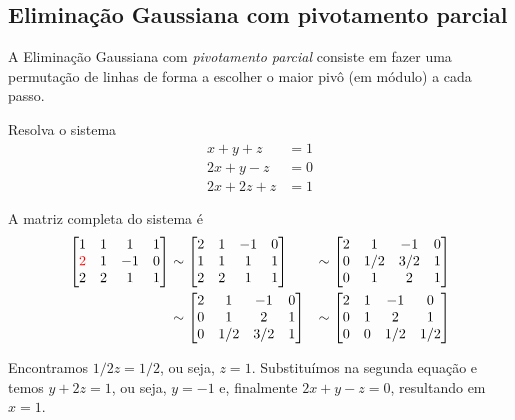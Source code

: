 \subsection{Eliminação Gaussiana com pivotamento parcial}
A Eliminação Gaussiana com \emph{pivotamento parcial} consiste em fazer uma permutação de linhas de forma a escolher o maior pivô (em módulo) a cada passo.

\begin{ex} Resolva o sistema
\begin{align}
  x+y+z &=1\\
  2x+y-z&=0\\
  2x+2z+z&=1
\end{align}

\end{ex}

\begin{sol}
A matriz completa do sistema é
\begin{align}
  \begin{bmatrix}
  1 &1&  1&1\\
  {\color{red}{2}} &1& -1&0\\
  2 & 2 &1&1
  \end{bmatrix}
&\sim
  \begin{bmatrix}
  2 &1& -1&0\\
  1 &1&  1&1\\
  2 &2&  1&1
  \end{bmatrix} 
&\sim 
  \begin{bmatrix}
  2 &1& -1&0\\
  0 &1/2& 3/2&1\\
  0 & 1 &2&1
  \end{bmatrix}\\
&\sim
  \begin{bmatrix}
  2 &1& -1&0\\
  0 & 1 &2&1\\
  0 &1/2& 3/2&1
  \end{bmatrix}
&\sim 
  \begin{bmatrix}
  2 &1& -1&0\\
  0 & 1 &2&1\\
  0 &0& 1/2&1/2
  \end{bmatrix}
\end{align}

Encontramos $1/2z=1/2$, ou seja, $z=1$. Substituímos na segunda equação e temos $y+2z=1$, ou seja, $y=-1$ e, finalmente $2x+y-z=0$, resultando em $x=1$.
\end{sol}

